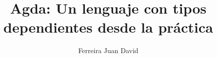 \documentclass[xetex, 11pt,spanish]{beamer}
\theoremstyle{mystyle}
\begin{document}
\author{Ferreira Juan David}
	\title{Agda: Un lenguaje con tipos dependientes desde la práctica}
	\begin{frame}[plain]
		\maketitle
	\end{frame}
  
  
  
  
  
  
  
  
  
  
\end{document}

